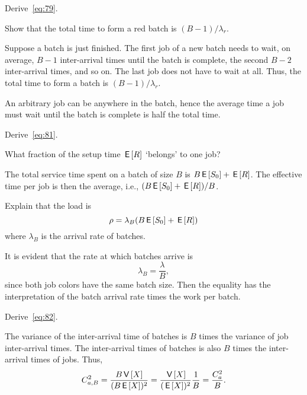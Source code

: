 \begin{extra}\label{ex:48}
  Derive~\eqref{eq:79}.
 \begin{hint}
 Show that the total time to form a red batch is $(B-1)/\lambda_r$. 
 \end{hint}
\begin{solution}
  Suppose a batch is just finished. The first job of a new batch needs to wait, on average, $B-1$  inter-arrival times until the batch is complete, the second $B-2$ inter-arrival times, and so on. The last job does not have to wait at all. Thus, the total time to form a batch is $(B-1)/\lambda_r$. 

An arbitrary job can be anywhere in the batch, hence the average time a job must wait until the batch is complete is half the total time. 
\end{solution}
\end{extra}


\begin{extra}
  Derive~\eqref{eq:81}.
  \begin{hint}
    What fraction of the setup time $\,\mathsf{E}\left[R\right]$ `belongs' to one job?
  \end{hint}
  \begin{solution}
    The total service time spent on a batch of size $B$ is $B \,\mathsf{E}\left[S_0\right] + \,\mathsf{E}\left[R\right]$. The effective time per job is then the average, i.e.,  $(B \,\mathsf{E}\left[S_0\right]+\,\mathsf{E}\left[R\right])/B$. 
  \end{solution}
\end{extra}

\begin{extra}
Explain that the load is 
\begin{equation*}
\rho = \lambda_B (B \,\mathsf{E}\left[S_0\right] + \,\mathsf{E}\left[R\right])
\end{equation*}
where $\lambda_B$ is the arrival rate of batches. 
\begin{solution}
It is evident that the  rate at which batches arrive is 
\begin{equation*}
  \lambda_B = \frac \lambda B,
\end{equation*}
since both job colors have the same batch size.  
Then  the equality has the interpretation of the batch arrival rate times the work per batch.
\end{solution}
\end{extra}


\begin{extra}
Derive~\cref{eq:82}.
  \begin{solution}
The variance of the inter-arrival time of batches is $B$ times the variance of job inter-arrival times. The inter-arrival times of batches is also $B$ times the inter-arrival times of jobs. Thus, 
\begin{equation*}
  C_{a,B}^2 = \frac{B \,\mathsf{V}\left[X\right]}{(B \,\mathsf{E}\left[X\right])^2} = \frac{\,\mathsf{V}\left[X\right]}{(\,\mathsf{E}\left[X\right])^2} \frac 1 B =  \frac{C_a^2}{B}.
\end{equation*}
  \end{solution}
\end{extra}



